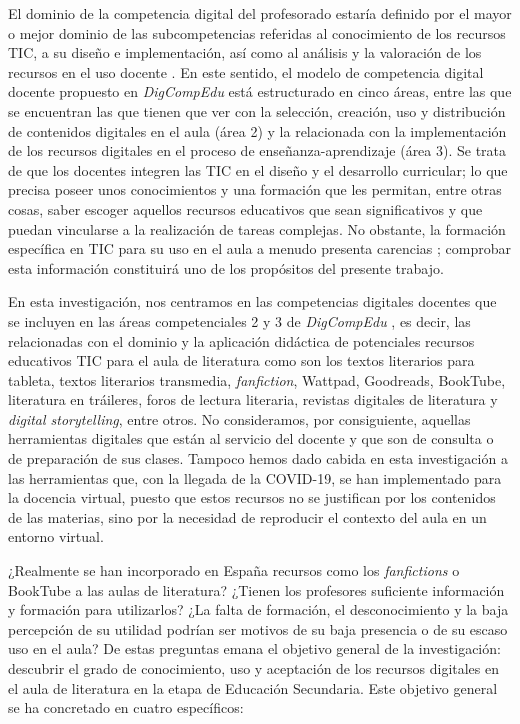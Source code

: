 \documentclass[spanish]{textolivre}
\begin{document}
El dominio de la competencia digital del profesorado estaría definido por el mayor o mejor dominio de las subcompetencias referidas al conocimiento de los recursos TIC, a su diseño e implementación, así como al análisis y la valoración de los recursos en el uso docente \cite{duran_cuartero_propuesta_2016}. En este sentido, el modelo de competencia digital docente propuesto en \textit{DigCompEdu} \cite{redecker_european_2017} está estructurado en cinco áreas, entre las que se encuentran las que tienen que ver con la selección, creación, uso y distribución de contenidos digitales en el aula (área 2) y la relacionada con la implementación de los recursos digitales en el proceso de enseñanza-aprendizaje (área 3).  Se trata de que los docentes integren las TIC en el diseño y el desarrollo curricular; lo que precisa poseer unos conocimientos y una formación que les permitan, entre otras cosas, saber escoger aquellos recursos educativos que sean significativos y que puedan vincularse a la realización de tareas complejas. No obstante, la formación específica en TIC para su uso en el aula a menudo presenta carencias \cite{almerich_necesidades_2011}; comprobar esta información constituirá uno de los propósitos del presente trabajo.

En esta investigación, nos centramos en las competencias digitales docentes que se incluyen en las áreas competenciales 2 y 3 de \textit{DigCompEdu} \cite{redecker_european_2017}, es decir, las relacionadas con el dominio y la aplicación didáctica de potenciales recursos educativos TIC para el aula de literatura como son los textos literarios para tableta, textos literarios transmedia, \textit{fanfiction}, Wattpad, Goodreads, BookTube, literatura en tráileres, foros de lectura literaria, revistas digitales de literatura y \textit{digital storytelling}, entre otros. No consideramos, por consiguiente, aquellas herramientas digitales que están al servicio del docente y que son de consulta o de preparación de sus clases. Tampoco hemos dado cabida en esta investigación a las herramientas que, con la llegada de la COVID-19, se han implementado para la docencia virtual, puesto que estos recursos no se justifican por los contenidos de las materias, sino por la necesidad de reproducir el contexto del aula en un entorno virtual.

¿Realmente se han incorporado en España recursos como los \textit{fanfictions} o BookTube a las aulas de literatura? ¿Tienen los profesores suficiente información y formación para utilizarlos? ¿La falta de formación, el desconocimiento y la baja percepción de su utilidad podrían ser motivos de su baja presencia o de su escaso uso en el aula? De estas preguntas emana el objetivo general de la investigación: descubrir el grado de conocimiento, uso y aceptación de los recursos digitales en el aula de literatura en la etapa de Educación Secundaria. Este objetivo general se ha concretado en cuatro específicos:
\end{document}
